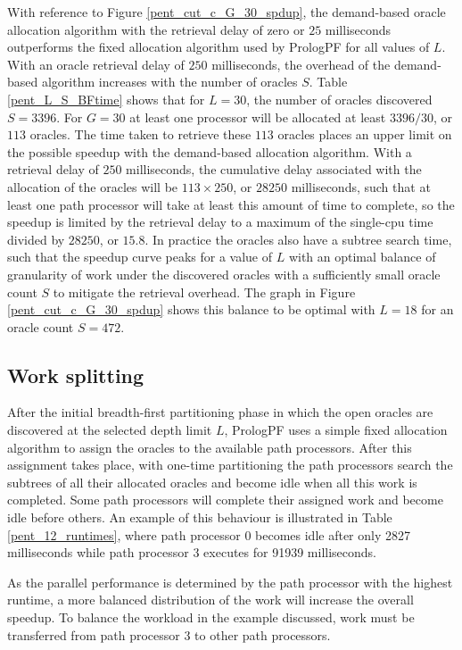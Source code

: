 With reference to Figure \ref{pent_cut_c_G_30_spdup}, the demand-based oracle allocation
algorithm with the retrieval delay of zero or $25$ milliseconds outperforms the fixed
allocation algorithm used by PrologPF for all values of $L$.  With an oracle retrieval
delay of $250$ milliseconds, the overhead of the demand-based algorithm increases with the
number of oracles $S$.  Table \ref{pent_L_S_BFtime} shows that for $L=30$, the number of
oracles discovered $S=3396$.  For $G=30$ at least one processor will be allocated at
least $3396/30$, or $113$ oracles.  
The time taken to retrieve these $113$ oracles places an upper limit on the possible
speedup with the demand-based allocation algorithm.
With a retrieval delay of $250$ milliseconds, the
cumulative delay associated with the allocation of the oracles will be $113\times 250$,
or $28250$ milliseconds, such that at least one path processor will take at least this amount
of time to complete, so the speedup is limited by the retrieval delay to a maximum of
the single-cpu time divided by $28250$, or $15.8$.  In practice the oracles also have
a subtree search time, such that the speedup curve peaks for a value of $L$ with an optimal
balance of granularity of work under the discovered oracles with a sufficiently small oracle
count $S$ to mitigate the retrieval overhead.  The graph in Figure \ref{pent_cut_c_G_30_spdup}
shows this balance to be optimal with $L=18$ for an oracle count $S=472$.

\subsection{Work splitting}
\label{bfp_work_splitting}

After the initial breadth-first partitioning phase in which the open oracles are
discovered at the selected depth limit $L$,  PrologPF uses a simple fixed allocation
algorithm to assign the oracles to the available path processors.  After this assignment
takes place, with one-time partitioning the path processors search the subtrees of all 
their allocated oracles
and become idle when all this work is completed.  Some path processors will complete
their assigned work and become idle before others.  An example of this behaviour is
illustrated in Table \ref{pent_12_runtimes}, where path processor 0 becomes idle after
only 2827 milliseconds while path processor 3 executes for 91939 milliseconds.

As the parallel performance is determined by the path processor with the highest runtime, a
more balanced distribution of the work will increase the overall speedup.  To balance the
workload in the example discussed, work must be transferred from path processor 3 to
other path processors.

